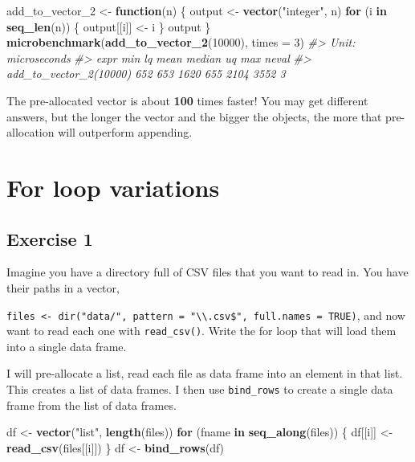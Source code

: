 \documentclass[]{book}
\newenvironment{Shaded}{\begin{snugshade}}{\end{snugshade}}
\newcommand{\CommentTok}[1]{\textcolor[rgb]{0.56,0.35,0.01}{\textit{#1}}}
\newcommand{\ControlFlowTok}[1]{\textcolor[rgb]{0.13,0.29,0.53}{\textbf{#1}}}
\newcommand{\DataTypeTok}[1]{\textcolor[rgb]{0.13,0.29,0.53}{#1}}
\newcommand{\DecValTok}[1]{\textcolor[rgb]{0.00,0.00,0.81}{#1}}
\newcommand{\KeywordTok}[1]{\textcolor[rgb]{0.13,0.29,0.53}{\textbf{#1}}}
\newcommand{\NormalTok}[1]{#1}
\newcommand{\StringTok}[1]{\textcolor[rgb]{0.31,0.60,0.02}{#1}}
\theoremstyle{plain}
\theoremstyle{remark}
\theoremstyle{definition}
\theoremstyle{definition}
\theoremstyle{definition}
\theoremstyle{remark}
\begin{document}
\begin{Shaded}
\begin{Highlighting}[]
\NormalTok{add_to_vector_}\DecValTok{2}\NormalTok{ <-}\StringTok{ }\ControlFlowTok{function}\NormalTok{(n) \{}
\NormalTok{  output <-}\StringTok{ }\KeywordTok{vector}\NormalTok{(}\StringTok{"integer"}\NormalTok{, n)}
  \ControlFlowTok{for}\NormalTok{ (i }\ControlFlowTok{in} \KeywordTok{seq_len}\NormalTok{(n)) \{}
\NormalTok{    output[[i]] <-}\StringTok{ }\NormalTok{i}
\NormalTok{  \}}
\NormalTok{  output}
\NormalTok{\}}
\KeywordTok{microbenchmark}\NormalTok{(}\KeywordTok{add_to_vector_2}\NormalTok{(}\DecValTok{10000}\NormalTok{), }\DataTypeTok{times =} \DecValTok{3}\NormalTok{)}
\CommentTok{#> Unit: microseconds}
\CommentTok{#>                    expr min  lq mean median   uq  max neval}
\CommentTok{#>  add_to_vector_2(10000) 652 653 1620    655 2104 3552     3}
\end{Highlighting}
\end{Shaded}

The pre-allocated vector is about \textbf{100} times faster! You may get
different answers, but the longer the vector and the bigger the objects,
the more that pre-allocation will outperform appending.

\hypertarget{for-loop-variations}{%
\section{For loop variations}\label{for-loop-variations}}

\hypertarget{exercise-1-58}{%
\subsection{Exercise 1}\label{exercise-1-58}}

Imagine you have a directory full of CSV files that you want to read in.
You have their paths in a vector,

\texttt{files\ \textless{}-\ dir("data/",\ pattern\ =\ "\textbackslash{}\textbackslash{}.csv\$",\ full.names\ =\ TRUE)},
and now want to read each one with \texttt{read\_csv()}. Write the for
loop that will load them into a single data frame.

I will pre-allocate a list, read each file as data frame into an element
in that list. This creates a list of data frames. I then use
\texttt{bind\_rows} to create a single data frame from the list of data
frames.

\begin{Shaded}
\begin{Highlighting}[]
\NormalTok{df <-}\StringTok{ }\KeywordTok{vector}\NormalTok{(}\StringTok{"list"}\NormalTok{, }\KeywordTok{length}\NormalTok{(files))}
\ControlFlowTok{for}\NormalTok{ (fname }\ControlFlowTok{in} \KeywordTok{seq_along}\NormalTok{(files)) \{}
\NormalTok{  df[[i]] <-}\StringTok{ }\KeywordTok{read_csv}\NormalTok{(files[[i]])}
\NormalTok{\}}
\NormalTok{df <-}\StringTok{ }\KeywordTok{bind_rows}\NormalTok{(df)}
\end{Highlighting}
\end{Shaded}
\end{document}
